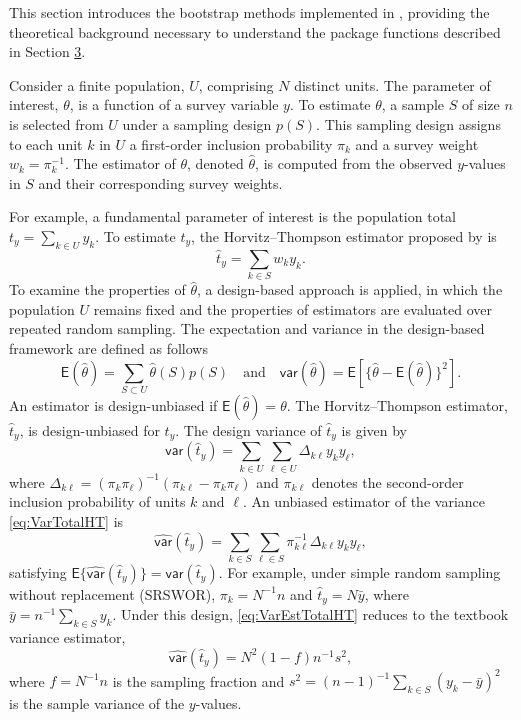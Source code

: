 This section introduces the bootstrap methods implemented in , providing the theoretical background necessary to understand the package functions described in Section \hyperref[sec:pkgbootsurv]{3}.

Consider a finite population, \(U\), comprising \(N\) distinct units. The parameter of interest, \(\theta\), is a function of a survey variable \(y\). To estimate \(\theta\), a sample \(\textrm{$S$}\) of size \(n\) is selected from \(U\) under a sampling design \(p(\textrm{$S$})\). This sampling design assigns to each unit \(k\) in \(U\) a first-order inclusion probability \(\pi_k\) and a survey weight \(w_k = \pi_k^{-1}\). The estimator of \(\theta\), denoted \(\hat\theta\), is computed from the observed \(y\)-values in \(\textrm{$S$}\) and their corresponding survey weights.

For example, a fundamental parameter of interest is the population total \(t_y = \sum_{k \in U} y_k\). To estimate \(t_y\), the Horvitz--Thompson estimator proposed by \citet{Horvitz:Thompson:1952} is
\[
    \hat t_y= \sum_{k \in \textrm{$S$}} w_k y_k.
\]
To examine the properties of \(\hat\theta\), a design-based approach is applied, in which the population \(U\) remains fixed and the properties of estimators are evaluated over repeated random sampling. The expectation and variance in the design-based framework are defined as follows
\[
    \mathsf{E}(\hat\theta)= \sum_{\textrm{$S$}\subset U} \hat\theta (\textrm{$S$}) p(\textrm{$S$}) \quad \text{and} \quad \mathsf{var}(\hat\theta) = \mathsf{E}[\{\hat\theta-\mathsf{E}(\hat\theta)\}^2].
\]
An estimator is design-unbiased if \(\mathsf{E}(\hat \theta)= \theta\). The Horvitz--Thompson estimator, \(\hat t_y\), is design-unbiased for \(t_y\).
The design variance of \(\hat t_y\) is given by
\begin{equation}
    \mathsf{var}(\hat t_y) = \sum_{k \in U} \sum_{\textrm{$\ell$}\in U} \Delta_{k\textrm{$\ell$}} y_k y_\textrm{$\ell$}, 
      \label{eq:VarTotalHT}
\end{equation}
where \(\Delta_{k\textrm{$\ell$}} = (\pi_k \pi_\textrm{$\ell$})^{-1}(\pi_{k\textrm{$\ell$}}-\pi_k \pi_\textrm{$\ell$})\) and \(\pi_{k\textrm{$\ell$}}\) denotes the second-order inclusion probability of units \(k\) and \(\textrm{$\ell$}\). An unbiased estimator of the variance \eqref{eq:VarTotalHT} is
\begin{equation}
         \hat{\mathsf{var}}(\hat t_y) = \sum_{k \in \textrm{$S$}} \sum_{\textrm{$\ell$}\in \textrm{$S$}} \pi_{k\textrm{$\ell$}}^{-1} \Delta_{k\textrm{$\ell$}} y_k y_\textrm{$\ell$}, 
       \label{eq:VarEstTotalHT}
\end{equation}
satisfying \(\mathsf{E}\{\hat{\mathsf{var}}(\hat t_y)\}=\mathsf{var}(\hat t_y)\).
For example, under simple random sampling without replacement (SRSWOR), \(\pi_k=N^{-1}n\) and \(\hat t_y= N\bar y\), where \(\bar y=n^{-1} \sum_{k \in \textrm{$S$}} y_k\). Under this design, \eqref{eq:VarEstTotalHT} reduces to the textbook variance estimator,
\[
    \hat{\mathsf{var}}(\hat t_y) = N^2 (1-f) n^{-1} s^2,
\]
where \(f=N^{-1}n\) is the sampling fraction and \(s^2=(n-1)^{-1}\sum_{k \in \textrm{$S$}} (y_k-\bar y)^2\) is the sample variance of the \(y\)-values.

